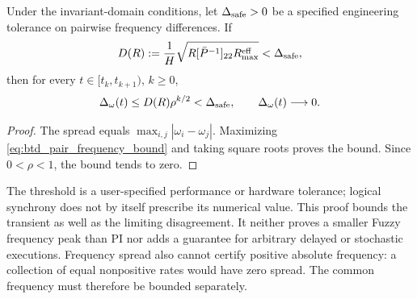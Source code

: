 \begin{btdcorollary}
\label{cor:btd_frequency_safety}
Under the invariant-domain conditions, let $\Delta_{\rm safe}>0$ be a
specified engineering tolerance on pairwise frequency differences. If
\begin{equation}
 D(R):=\frac1H\sqrt{R[\bar P^{-1}]_{22}R_{\max}^{\rm eff}}
       <\Delta_{\rm safe},
 \label{eq:btd_frequency_threshold_condition}
\end{equation}
then for every $t\in[t_k,t_{k+1})$, $k\ge0$,
\begin{equation}
 \Delta_\omega(t)\le D(R)\rho^{k/2}<\Delta_{\rm safe},
 \qquad \Delta_\omega(t)\longrightarrow0.
 \label{eq:btd_frequency_decay}
\end{equation}
\end{btdcorollary}
\begin{proof}
The spread equals $\max_{i,j}|\omega_i-\omega_j|$. Maximizing
\eqref{eq:btd_pair_frequency_bound} and taking square roots proves
the bound. Since $0<\rho<1$, the bound tends to zero.
\end{proof}

The threshold is a user-specified performance or hardware tolerance;
logical synchrony does not by itself prescribe its numerical value.
This proof bounds the transient as well as the limiting disagreement.
It neither proves a smaller Fuzzy frequency peak than PI nor adds a
guarantee for arbitrary delayed or stochastic executions. Frequency
spread also cannot certify positive absolute frequency: a collection of
equal nonpositive rates would have zero spread. The common frequency
must therefore be bounded separately.

